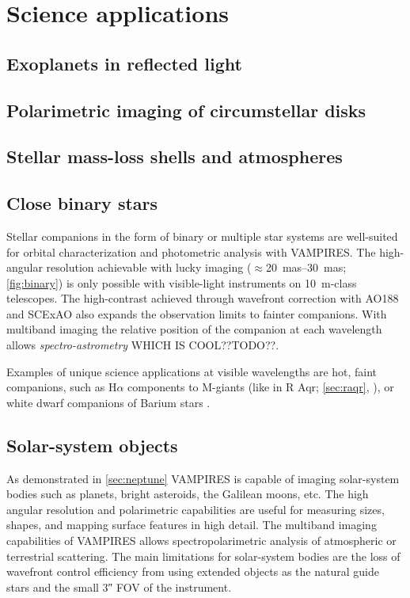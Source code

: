 \section{Science applications}\label{sec:science}

\subsection{Exoplanets in reflected light}

\subsection{Polarimetric imaging of circumstellar disks}

\subsection{Stellar mass-loss shells and atmospheres}

\subsection{Close binary stars}

Stellar companions in the form of binary or multiple star systems are well-suited for orbital characterization and photometric analysis with VAMPIRES. The high-angular resolution achievable with lucky imaging ($\approx$\SIrange{20}{30}{mas}; \autoref{fig:binary}) is only possible with visible-light instruments on \SI{10}{\meter}-class telescopes. The high-contrast achieved through wavefront correction with AO188 and SCExAO also expands the observation limits to fainter companions. With multiband imaging the relative position of the companion at each wavelength allows \textit{spectro-astrometry} WHICH IS COOL??TODO??.

Examples of unique science applications at visible wavelengths are hot, faint companions, such as H$\alpha$ components to M-giants (like in R Aqr; \autoref{sec:raqr}, \citet{schmid_spherezimpol_2017}), or white dwarf companions of Barium stars \citep{mcclure_binary_1980,escorza_barium_2019}.

\subsection{Solar-system objects}

As demonstrated in \autoref{sec:neptune} VAMPIRES is capable of imaging solar-system bodies such as planets, bright asteroids, the Galilean moons, etc. The high angular resolution and polarimetric capabilities are useful for measuring sizes, shapes, and mapping surface features in high detail. The multiband imaging capabilities of VAMPIRES allows spectropolarimetric analysis of atmospheric or terrestrial scattering. The main limitations for solar-system bodies are the loss of wavefront control efficiency from using extended objects as the natural guide stars and the small \ang{;;3} FOV of the instrument.

